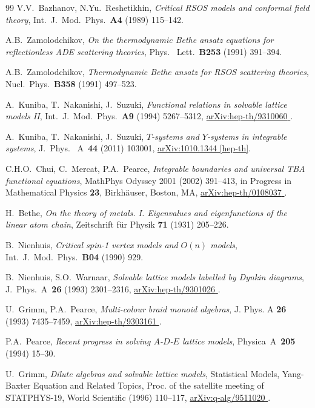 \documentclass[11pt]{article}
\numberwithin{equation}{section}
\theoremstyle{plain}
\numberwithin{equation}{section}
\def\arxiv#1#2{\href{http://arxiv.org/abs/#1}{\textsf{arXiv:#1 #2}}}
\begin{document}
\begin{thebibliography}{99}
V.V.~Bazhanov, N.Yu.~Reshetikhin, 
{\em Critical RSOS models and conformal field theory}, 
Int.~J.~Mod.~Phys.~{\bf A4} (1989) 115--142.

A.B.~Zamolodchikov,
{\em On the thermodynamic Bethe ansatz equations for reflectionless ADE scattering theories},
Phys.~ Lett.~{\bf B253} (1991) 391--394.
 
A.B.~Zamolodchikov,
{\em Thermodynamic Bethe ansatz for RSOS scattering theories}, 
Nucl.~Phys.~{\bf B358} (1991) 497--523.
		
A.~Kuniba, T.~Nakanishi, J.~Suzuki,
{\em Functional relations in solvable lattice models II\/},
Int.~J.~Mod.~Phys.~{\bf A9} (1994) 5267--5312,
\arxiv{hep-th/9310060}{\!\!}.
 
A.~Kuniba, T.~Nakanishi, J.~Suzuki,
{\em $T$-systems and $Y$-systems in integrable systems},
J.~Phys.~ A~{\bf 44} (2011) 103001,
\arxiv{1010.1344}{[hep-th]}.

C.H.O.~Chui, C.~Mercat, P.A.~Pearce, 
{\em Integrable boundaries and universal TBA functional equations}, 
MathPhys Odyssey 2001 (2002) 391--413, 
in Progress in Mathematical Physics {\bf 23}, Birkh\"auser, Boston, MA,
\arxiv{hep-th/0108037}{\!\!}.

H.~Bethe, 
{\em On the theory of metals. I. Eigenvalues and eigenfunctions of the linear atom chain}, 
Zeitschrift f\"ur Physik {\bf 71} (1931) 205--226.

B.~Nienhuis, 
{\em Critical spin-1 vertex models and $O(n)$ models},
Int.~J.~Mod.~Phys.~{\bf B04} (1990) 929.
	
B.~Nienhuis, S.O.~Warnaar,
{\em Solvable lattice models labelled by Dynkin diagrams},
J.~Phys.~A~{\bf 26} (1993) 2301--2316,
\arxiv{hep-th/9301026}{\!\!}.
		
U.~Grimm, P.A.~Pearce,
{\em Multi-colour braid monoid algebras}, 
J. Phys. A {\bf 26} (1993) 7435--7459,
\arxiv{hep-th/9303161}{\!\!}.

P.A.~Pearce,
{\em Recent progress in solving $A$-$D$-$E$ lattice models}, 
Physica~A~{\bf 205} (1994) 15--30.

U.~Grimm,
{\em Dilute algebras and solvable lattice models},
Statistical Models, Yang-Baxter Equation and Related Topics, Proc. of the satellite meeting of STATPHYS-19, 
World Scientific (1996) 110--117, 
\arxiv{q-alg/9511020}{\!\!}.		


\end{thebibliography}
\end{document}
